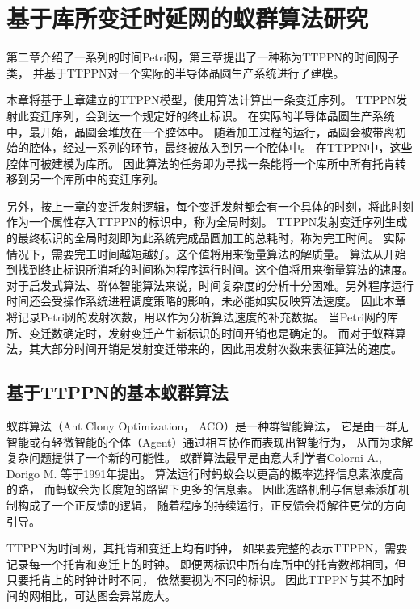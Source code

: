 \chapter{基于库所变迁时延网的蚁群算法研究}
第二章介绍了一系列的时间Petri网，第三章提出了一种称为TTPPN的时间网子类，
并基于TTPPN对一个实际的半导体晶圆生产系统进行了建模。

本章将基于上章建立的TTPPN模型，使用算法计算出一条变迁序列。
TTPPN发射此变迁序列，会到达一个规定好的终止标识。
在实际的半导体晶圆生产系统中，最开始，晶圆会堆放在一个腔体中。
随着加工过程的运行，晶圆会被带离初始的腔体，经过一系列的环节，最终被放入到另一个腔体中。
在TTPPN中，这些腔体可被建模为库所。
因此算法的任务即为寻找一条能将一个库所中所有托肯转移到另一个库所中的变迁序列。

另外，按上一章的变迁发射逻辑，每个变迁发射都会有一个具体的时刻，将此时刻作为一个属性存入TTPPN的标识中，称为全局时刻。
TTPPN发射变迁序列生成的最终标识的全局时刻即为此系统完成晶圆加工的总耗时，称为完工时间。
实际情况下，需要完工时间越短越好。这个值将用来衡量算法的解质量。
算法从开始到找到终止标识所消耗的时间称为程序运行时间。这个值将用来衡量算法的速度。
对于启发式算法、群体智能算法来说，时间复杂度的分析十分困难。另外程序运行时间还会受操作系统进程调度策略的影响，未必能如实反映算法速度。
因此本章将记录Petri网的发射次数，用以作为分析算法速度的补充数据。
当Petri网的库所、变迁数确定时，发射变迁产生新标识的时间开销也是确定的。
而对于蚁群算法，其大部分时间开销是发射变迁带来的，因此用发射次数来表征算法的速度。
\section{基于TTPPN的基本蚁群算法}
蚁群算法（Ant Clony Optimization， ACO）是一种群智能算法，
它是由一群无智能或有轻微智能的个体（Agent）通过相互协作而表现出智能行为，
从而为求解复杂问题提供了一个新的可能性。
蚁群算法最早是由意大利学者Colorni A., Dorigo M. 等于1991年提出。
算法运行时蚂蚁会以更高的概率选择信息素浓度高的路，
而蚂蚁会为长度短的路留下更多的信息素。
因此选路机制与信息素添加机制构成了一个正反馈的逻辑，
随着程序的持续运行，正反馈会将解往更优的方向引导\cite{blum2003metaheuristics}\cite{li2015survey}\cite{colorni1992distributed}\cite{kennedy1995particle}\cite{dorigo2004ant}。

TTPPN为时间网，其托肯和变迁上均有时钟，
如果要完整的表示TTPPN，需要记录每一个托肯和变迁上的时钟。
即便两标识中所有库所中的托肯数都相同，但只要托肯上的时钟计时不同，
依然要视为不同的标识。
因此TTPPN与其不加时间的网相比，可达图会异常庞大。

